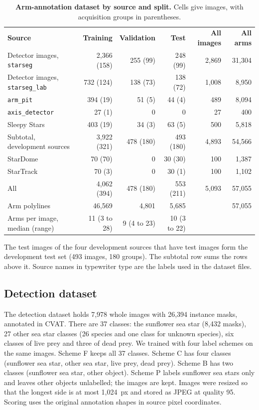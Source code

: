 \begin{table}[!htbp]
\centering
\caption{\textbf{Arm-annotation dataset by source and split.} Cells give images, with acquisition groups in parentheses.}
\label{tab:armdata}
{\small
\begin{tabular}{|l|r|r|r|r|r|}
\hline
\textbf{Source} & \textbf{Training} & \textbf{Validation} & \textbf{Test} & \textbf{All images} & \textbf{All arms} \\ \thickhline
Detector images, \texttt{starseg} & 2,366 (158) & 255 (99) & 248 (99) & 2,869 & 31,304 \\ \hline
Detector images, \texttt{starseg\_lab} & 732 (124) & 138 (73) & 138 (72) & 1,008 & 8,950 \\ \hline
\texttt{arm\_pit} & 394 (19) & 51 (5) & 44 (4) & 489 & 8,094 \\ \hline
\texttt{axis\_detector} & 27 (1) & 0 & 0 & 27 & 400 \\ \hline
Sleepy Stars & 403 (19) & 34 (3) & 63 (5) & 500 & 5,818 \\ \hline
Subtotal, development sources & 3,922 (321) & 478 (180) & 493 (180) & 4,893 & 54,566 \\ \thickhline
StarDome & 70 (70) & 0 & 30 (30) & 100 & 1,387 \\ \hline
StarTrack & 70 (3) & 0 & 30 (1) & 100 & 1,102 \\ \thickhline
All & 4,062 (394) & 478 (180) & 553 (211) & 5,093 & 57,055 \\ \hline
Arm polylines & 46,569 & 4,801 & 5,685 & & 57,055 \\ \hline
Arms per image, median (range) & 11 (3 to 28) & 9 (4 to 23) & 10 (3 to 22) & & \\ \hline
\end{tabular}
}
\begin{flushleft}\small
The test images of the four development sources that have test images form the development test set (493 images, 180 groups).
The subtotal row sums the rows above it.
Source names in typewriter type are the labels used in the dataset files.
\end{flushleft}
\end{table}

\subsection*{Detection dataset}

The detection dataset holds 7,978 whole images with 26,394 instance masks, annotated in CVAT.
There are 37 classes: the sunflower sea star (8,432 masks), 27 other sea star classes (26 species and one class for unknown species), six classes of live prey and three of dead prey.
We trained with four label schemes on the same images.
Scheme F keeps all 37 classes.
Scheme C has four classes (sunflower sea star, other sea star, live prey, dead prey).
Scheme B has two classes (sunflower sea star, other object).
Scheme P labels sunflower sea stars only and leaves other objects unlabelled; the images are kept.
Images were resized so that the longest side is at most 1,024~px and stored as JPEG at quality 95.
Scoring uses the original annotation shapes in source pixel coordinates.

